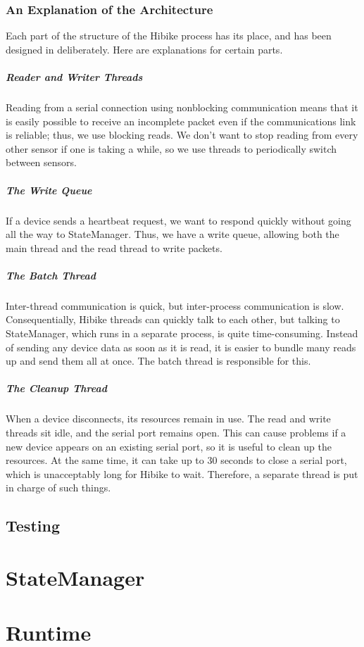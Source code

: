 \documentclass[12pt]{book}
\begin{document}
\subsection{An Explanation of the Architecture}
Each part of the structure of the Hibike process has its place, and has
been designed in deliberately. Here are explanations for certain parts.

\paragraph{Reader and Writer Threads}
Reading from a serial connection using nonblocking communication means that it
is easily possible to receive an incomplete packet even if the communications
link is reliable; thus, we use blocking reads. We don't want to stop reading
from every other sensor if one is taking a while, so we use threads to
periodically switch between sensors.

\paragraph{The Write Queue}
If a device sends a heartbeat request, we want to respond quickly
without going all the way to StateManager. Thus, we have a write queue, allowing
both the main thread and the read thread to write packets.

\paragraph{The Batch Thread}
Inter-thread communication is quick, but inter-process communication is slow.
Consequentially,
Hibike threads can quickly talk to each other, but talking to StateManager, which
runs in a separate process, is quite time-consuming. Instead of
sending any device data as soon as it is read, it is easier to bundle many
reads up and send them all at once. The batch thread is responsible for this.

\paragraph{The Cleanup Thread}
When a device disconnects, its resources remain in use. The read
and write threads sit idle, and the serial port remains open. This
can cause problems if a new device appears on an existing serial port,
so it is useful to clean up the resources. At the same time, it
can take up to 30 seconds to close a serial port, which is unacceptably
long for Hibike to wait. Therefore, a separate thread is put in charge
of such things.

\section{Testing}
\chapter{StateManager}
\chapter{Runtime}
\end{document}
